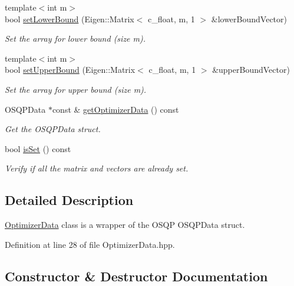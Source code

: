 \begin{DoxyCompactItemize}
{\footnotesize template$<$int m$>$ }\\bool \hyperlink{classOSQPWrapper_1_1OptimizerData_adeae6b9d09828d618daae146217ad0ef}{set\+Lower\+Bound} (Eigen\+::\+Matrix$<$ c\+\_\+float, m, 1 $>$ \&lower\+Bound\+Vector)
\begin{DoxyCompactList}\small\item\em Set the array for lower bound (size m). \end{DoxyCompactList}\item 
{\footnotesize template$<$int m$>$ }\\bool \hyperlink{classOSQPWrapper_1_1OptimizerData_a7c9b1f0a11f424f81c3ad80a4337267d}{set\+Upper\+Bound} (Eigen\+::\+Matrix$<$ c\+\_\+float, m, 1 $>$ \&upper\+Bound\+Vector)
\begin{DoxyCompactList}\small\item\em Set the array for upper bound (size m). \end{DoxyCompactList}\item 
O\+S\+Q\+P\+Data $\ast$const \& \hyperlink{classOSQPWrapper_1_1OptimizerData_a8210bda64ae24e89ac0857cc893032dc}{get\+Optimizer\+Data} () const 
\begin{DoxyCompactList}\small\item\em Get the O\+S\+Q\+P\+Data struct. \end{DoxyCompactList}\item 
bool \hyperlink{classOSQPWrapper_1_1OptimizerData_ac3def0227cdb687a9b3900b52c259578}{is\+Set} () const 
\begin{DoxyCompactList}\small\item\em Verify if all the matrix and vectors are already set. \end{DoxyCompactList}\end{DoxyCompactItemize}


\subsection{Detailed Description}
\hyperlink{classOSQPWrapper_1_1OptimizerData}{Optimizer\+Data} class is a wrapper of the O\+S\+QP O\+S\+Q\+P\+Data struct. 

Definition at line 28 of file Optimizer\+Data.\+hpp.



\subsection{Constructor \& Destructor Documentation}
